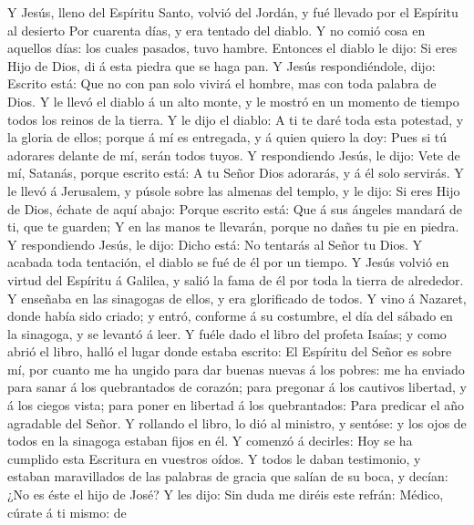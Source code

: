  Y Jesús, lleno del Espíritu Santo, volvió del Jordán, y
fué llevado por el Espíritu al desierto  Por cuarenta
días, y era tentado del diablo. Y no comió cosa en aquellos días: los
cuales pasados, tuvo hambre.  Entonces el diablo le dijo:
Si eres Hijo de Dios, di á esta piedra que se haga pan.  Y
Jesús respondiéndole, dijo: Escrito está: Que no con pan solo vivirá el
hombre, mas con toda palabra de Dios.  Y le llevó el
diablo á un alto monte, y le mostró en un momento de tiempo todos los
reinos de la tierra.  Y le dijo el diablo: A ti te daré
toda esta potestad, y la gloria de ellos; porque á mí es entregada, y á
quien quiero la doy:  Pues si tú adorares delante de mí,
serán todos tuyos.  Y respondiendo Jesús, le dijo: Vete de
mí, Satanás, porque escrito está: A tu Señor Dios adorarás, y á él solo
servirás.  Y le llevó á Jerusalem, y púsole sobre las
almenas del templo, y le dijo: Si eres Hijo de Dios, échate de aquí
abajo:  Porque escrito está: Que á sus ángeles mandará de
ti, que te guarden;  Y en las manos te llevarán, porque
no dañes tu pie en piedra.  Y respondiendo Jesús, le
dijo: Dicho está: No tentarás al Señor tu Dios.  Y
acabada toda tentación, el diablo se fué de él por un tiempo.
 Y Jesús volvió en virtud del Espíritu á Galilea, y salió
la fama de él por toda la tierra de alrededor.  Y
enseñaba en las sinagogas de ellos, y era glorificado de todos.
 Y vino á Nazaret, donde había sido criado; y entró,
conforme á su costumbre, el día del sábado en la sinagoga, y se levantó
á leer.  Y fuéle dado el libro del profeta Isaías; y como
abrió el libro, halló el lugar donde estaba escrito:  El
Espíritu del Señor es sobre mí, por cuanto me ha ungido para dar buenas
nuevas á los pobres: me ha enviado para sanar á los quebrantados de
corazón; para pregonar á los cautivos libertad, y á los ciegos vista;
para poner en libertad á los quebrantados:  Para predicar
el año agradable del Señor.  Y rollando el libro, lo dió
al ministro, y sentóse: y los ojos de todos en la sinagoga estaban fijos
en él.  Y comenzó á decirles: Hoy se ha cumplido esta
Escritura en vuestros oídos.  Y todos le daban
testimonio, y estaban maravillados de las palabras de gracia que salían
de su boca, y decían: ¿No es éste el hijo de José?  Y les
dijo: Sin duda me diréis este refrán: Médico, cúrate á ti mismo: de
